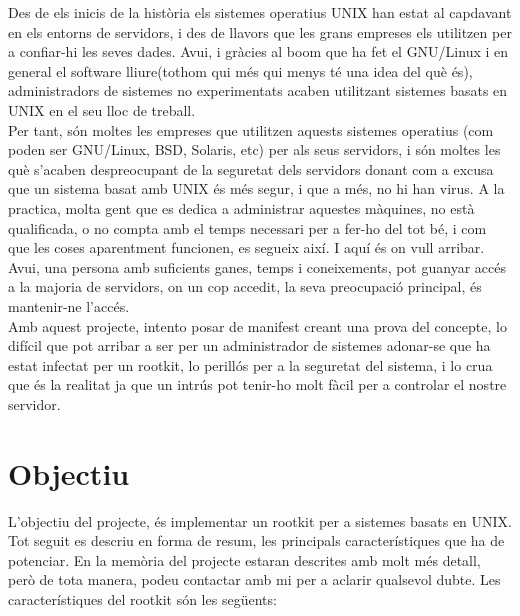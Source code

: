 \documentclass[a4paper]{article}
\begin{document}
Des de els inicis de la història els sistemes operatius UNIX han estat al capdavant en els
entorns de servidors, i des de llavors que les grans empreses els utilitzen per a confiar-hi
les seves dades. Avui, i gràcies al boom que ha fet el GNU/Linux i en general el software lliure(tothom qui més qui
menys té una idea del què és), administradors de sistemes no experimentats acaben
utilitzant sistemes basats en UNIX en el seu lloc de treball. \\
Per tant, són moltes les empreses que utilitzen aquests sistemes operatius (com poden ser
GNU/Linux, BSD, Solaris, etc) per als seus servidors, i són moltes les què s'acaben despreocupant
de la seguretat dels servidors donant com a excusa que un sistema basat amb UNIX és
més segur, i que a més, no hi han virus. A la practica, molta gent que es dedica a
administrar aquestes màquines, no està qualificada, o no compta amb el temps necessari
per a fer-ho del tot bé, i com que les coses aparentment funcionen, es segueix així.
I aquí és on vull arribar. Avui, una persona amb suficients ganes, temps i
coneixements, pot guanyar accés a la majoria de servidors, on un cop accedit, la seva
preocupació principal, és mantenir-ne l'accés.\\


Amb aquest projecte, intento posar de manifest creant una prova del concepte, lo difícil
que pot arribar a ser per un administrador de sistemes adonar-se que ha estat infectat per
un rootkit, lo perillós per a la seguretat del sistema, i lo crua que és la realitat ja que un
intrús pot tenir-ho molt fàcil per a controlar el nostre servidor.

\section{Objectiu}

L'objectiu del projecte, és implementar un rootkit per a sistemes basats en UNIX. Tot seguit
es descriu en forma de resum, les principals característiques que ha de potenciar. En la
memòria del projecte estaran descrites amb molt més detall, però de tota manera, podeu contactar
amb mi per a aclarir qualsevol dubte. Les característiques del rootkit són les següents:
\end{document}
